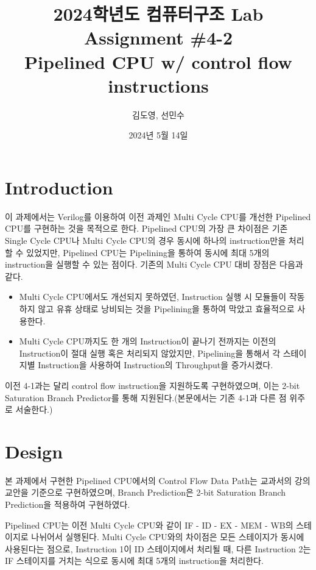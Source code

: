 \documentclass[openright, a4paper]{article}
\title{2024학년도 컴퓨터구조 Lab Assignment \#4-2\\
        Pipelined CPU w/ control flow instructions}
\author{김도영, 선민수}
\date{2024년 5월 14일}
\begin{document}
\maketitle


\section{Introduction}
이 과제에서는 Verilog를 이용하여 이전 과제인 Multi Cycle CPU를 개선한 Pipelined CPU를 구현하는 것을 목적으로 한다. Pipelined CPU의 가장 큰 차이점은 기존 Single Cycle CPU나 Multi Cycle CPU의 경우 동시에 하나의 instruction만을 처리할 수 있었지만, Pipelined CPU는 Pipelining을 통하여 동시에 최대 5개의 instruction을 실행할 수 있는 점이다. 기존의 Multi Cycle CPU 대비 장점은 다음과 같다.

\begin{itemize}
    \item Multi Cycle CPU에서도 개선되지 못하였던, Instruction 실행 시 모듈들이 작동하지 않고 유휴 상태로 낭비되는 것을 Pipelining을 통하여 막았고 효율적으로 사용한다.
    \item Multi Cycle CPU까지도 한 개의 Instruction이 끝나기 전까지는 이전의 Instruction이 절대 실행 혹은 처리되지 않았지만, Pipelining을 통해서 각 스테이지별 Instruction을 사용하여 Instruction의 Throughput을 증가시켰다.
\end{itemize}

이전 4-1과는 달리 control flow instruction을 지원하도록 구현하였으며, 이는 2-bit Saturation Branch Predictor를 통해 지원된다.(본문에서는 기존 4-1과 다른 점 위주로 서술한다.)


\section{Design}
본 과제에서 구현한 Pipelined CPU에서의 Control Flow Data Path는 교과서의 강의 교안을 기준으로 구현하였으며, Branch Prediction은 2-bit Saturation Branch Prediction을 적용하여 구현하였다.

\hfill

Pipelined CPU는 이전 Multi Cycle CPU와 같이 IF - ID - EX - MEM - WB의 스테이지로 나뉘어서 실행된다. Multi Cycle CPU와의 차이점은 모든 스테이지가 동시에 사용된다는 점으로, Instruction 1이 ID 스테이지에서 처리될 때, 다른 Instruction 2는 IF 스테이지를 거치는 식으로 동시에 최대 5개의 instruction을 처리한다.
\end{document}
